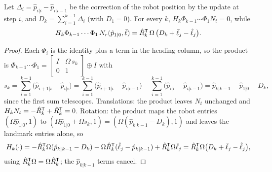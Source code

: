 \begin{theorem}
\label{thm:slam-obs}
Let $\Delta_i = \hat p_{i|i} - \hat p_{i|i-1}$ be the correction of the robot position by the update at step $i$, and $D_k = \sum_{i=1}^{k-1}\Delta_i$ (with $D_1 = 0$).
For every $k$, $H_k\Phi_{k-1}\cdots\Phi_1N_t = 0$, while
\begin{equation}
  H_k\Phi_{k-1}\cdots\Phi_1\,N_r(\hat p_{1|0}, \bar\ell) = \hat R_k^{\mathsf{T}}\,\Omega\,\big(D_k + \bar\ell_j - \hat\ell_j\big).
  \label{eq:slam-leak}
\end{equation}
\end{theorem}
\begin{proof}
Each $\Phi_i$ is the identity plus a term in the heading column, so the product is
$\Phi_{k-1}\cdots\Phi_1 = \begin{bmatrix} I & \Omega\,s_k \\ 0 & 1\end{bmatrix} \oplus I$ with
\begin{equation*}
  s_k = \sum_{i=1}^{k-1}\big(\hat p_{i+1|i} - \hat p_{i|i}\big)
      = \sum_{i=1}^{k-1}\big(\hat p_{i+1|i} - \hat p_{i|i-1}\big) - \sum_{i=1}^{k-1}\big(\hat p_{i|i} - \hat p_{i|i-1}\big)
      = \hat p_{k|k-1} - \hat p_{1|0} - D_k ,
\end{equation*}
since the first sum telescopes. Translations: the product leaves $N_t$ unchanged and $H_kN_t = -\hat R_k^{\mathsf{T}} + \hat R_k^{\mathsf{T}} = 0$. Rotation: the product
maps the robot entries $(\Omega\hat p_{1|0}, 1)$ to $(\Omega\hat p_{1|0} + \Omega s_k, 1) = (\Omega(\hat p_{k|k-1} - D_k), 1)$ and leaves the landmark entries alone, so
\begin{equation*}
  H_k(\cdot) = -\hat R_k^{\mathsf{T}}\Omega(\hat p_{k|k-1} - D_k) - \Omega\hat R_k^{\mathsf{T}}(\hat\ell_j - \hat p_{k|k-1}) + \hat R_k^{\mathsf{T}}\Omega\bar\ell_j
  = \hat R_k^{\mathsf{T}}\Omega\big(D_k + \bar\ell_j - \hat\ell_j\big),
\end{equation*}
using $\hat R_k^{\mathsf{T}}\Omega = \Omega\hat R_k^{\mathsf{T}}$; the $\hat p_{k|k-1}$ terms cancel.
\end{proof}

